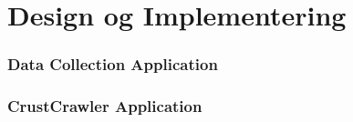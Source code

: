 \thispagestyle{fancy}
\chapter{Design og Implementering}
\label{chp:designogimpl}

\subsection{Data Collection Application}
\label{sec:datacoll}

\subsection{CrustCrawler Application}
\label{sec:ccapp}